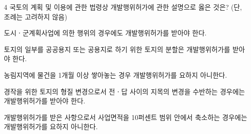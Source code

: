\begin{question}{4}
국토의 계획 및 이용에 관한 법령상 개발행위허가에 관한 설명으로 옳은 것은? (단, 조례는 고려하지 않음)
\begin{choices}
  \item 도시ㆍ군계획사업에 의한 행위의 경우에도 개발행위허가를 받아야 한다.
  \item 토지의 일부를 공공용지 또는 공용지로 하기 위한 토지의 분할은 개발행위허가를 받아야 한다.
  \item 농림지역에 물건을 1개월 이상 쌓아놓는 경우 개발행위허가를 요하지 아니한다.
  \item 경작을 위한 토지의 형질 변경으로서 전ㆍ답 사이의 지목의 변경을 수반하는 경우에는 개발행위허가를 받아야 한다.
  \item 개발행위허가를 받은 사항으로서 사업면적을 10퍼센트 범위 안에서 축소하는 경우에는 개발행위허가를 요하지 아니한다.
\end{choices}
\end{question}
